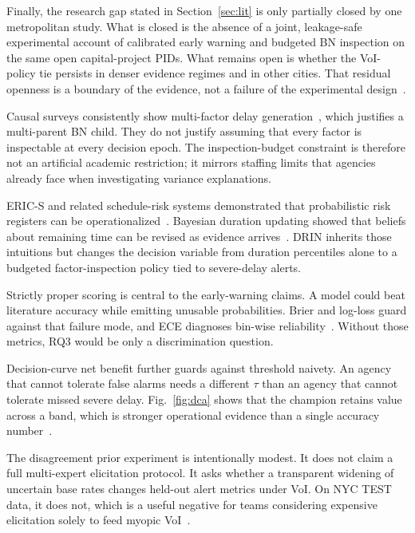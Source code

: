 Finally, the research gap stated in Section~\ref{sec:lit} is only partially closed by one metropolitan study. What is closed is the absence of a joint, leakage-safe experimental account of calibrated early warning and budgeted BN inspection on the same open capital-project PIDs. What remains open is whether the VoI-policy tie persists in denser evidence regimes and in other cities. That residual openness is a boundary of the evidence, not a failure of the experimental design~\cite{Memarzadeh2016,Regona2024,Abioye2021}.

Causal surveys consistently show multi-factor delay generation~\cite{Assaf2006,Sambasivan2007,Doloi2012}, which justifies a multi-parent BN child. They do not justify assuming that every factor is inspectable at every decision epoch. The inspection-budget constraint is therefore not an artificial academic restriction; it mirrors staffing limits that agencies already face when investigating variance explanations.

ERIC-S and related schedule-risk systems demonstrated that probabilistic risk registers can be operationalized~\cite{Nasir2003}. Bayesian duration updating showed that beliefs about remaining time can be revised as evidence arrives~\cite{Kim2016}. DRIN inherits those intuitions but changes the decision variable from duration percentiles alone to a budgeted factor-inspection policy tied to severe-delay alerts.

Strictly proper scoring is central to the early-warning claims. A model could beat literature accuracy while emitting unusable probabilities. Brier and log-loss guard against that failure mode, and ECE diagnoses bin-wise reliability~\cite{Brier1950,GneitingRaftery2007,Gneiting2007}. Without those metrics, RQ3 would be only a discrimination question.

Decision-curve net benefit further guards against threshold naivety. An agency that cannot tolerate false alarms needs a different $\tau$ than an agency that cannot tolerate missed severe delay. Fig.~\ref{fig:dca} shows that the champion retains value across a band, which is stronger operational evidence than a single accuracy number~\cite{Vickers2006}.

The disagreement prior experiment is intentionally modest. It does not claim a full multi-expert elicitation protocol. It asks whether a transparent widening of uncertain base rates changes held-out alert metrics under VoI. On NYC TEST data, it does not, which is a useful negative for teams considering expensive elicitation solely to feed myopic VoI~\cite{Khodabakhshian2025,Song2021}.


